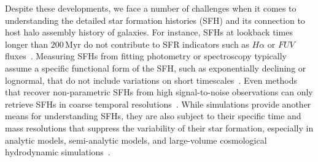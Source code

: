 \documentclass[12pt, letterpaper, preprint, tighten]{aastex62}
\begin{document}
Despite these developments, we face a number of challenges when it comes
to understanding the detailed star formation histories (SFH) and its
connection to host halo assembly history of galaxies.
For instance, SFHs at lookback times longer than $200\,\mathrm{Myr}$
do not contribute to SFR indicators such as $H\alpha$ or $FUV$ fluxes~\cite{sparre2017}.
Measuring SFHs from fitting photometry or spectroscopy typically
assume a specific functional form of the SFH, such as exponentially
declining or lognormal, that do not include variations on short
timescales~\citep[\emph{e.g.}][]{wilkinson2017, carnall2018}.
Even methods that recover non-parametric SFHs from high signal-to-noise
observations can only retrieve SFHs in coarse temporal resolutions~\citep[\emph{e.g.}][]{tojeiro2009, leja2018a}.
While simulations provide another means for understanding SFHs,
they are also subject to their specific time and mass resolutions that
suppress the variability of their star formation, especially in
analytic models, semi-analytic models, and large-volume cosmological
hydrodynamic simulations~\citep[][see also Figure~\ref{fig:illsfh}]{sparre2015, sparre2017}.
\end{document}
